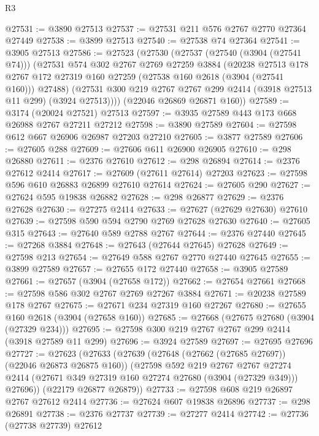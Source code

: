 \begin{lexlean}{R3}
\begin{coremodule}
@27531 := @3890 @27513
@27537 := @27531 @211 @576 @2767 @2770 @27364 @27449
@27538 := @3899 @27513
@27540 := @27538 @74 @27364
@27541 := @3905 @27513
@27586 := @27523
    (@27530
      (@27537
        (@27540 (@3904 (@27541 @74)))
        (@27531
          @574
          @302
          @2767
          @2769
          @27259
          @3884
          (@20238
            @27513
            @178
            @2767
            @172
            @27319
            @160
            @27259
            (@27538 @160 @2618 (@3904 (@27541 @160)))
            @27488)
          (@27531 @300 @219 @2767 @2767 @299 @2414 (@3918 @27513 @11 @299) (@3924 @27513))))
      (@22046 @26869 @26871 @160))
@27589 := @3174 (@20024 @27521) @27513
@27597 := @3935 @27589 @443 @173 @668 @26988 @2767 @27211 @27212
@27598 := @3890 @27589
@27604 := @27598 @612 @667 @26906 @26987 @27203 @27210
@27605 := @3877 @27589
@27606 := @27605 @288
@27609 := @27606 @611 @26900 @26905
@27610 := @298 @26880
@27611 := @2376 @27610
@27612 := @298 @26894
@27614 := @2376 @27612 @2414
@27617 := @27609 (@27611 @27614) @27203
@27623 := @27598 @596 @610 @26883 @26899 @27610 @27614
@27624 := @27605 @290
@27627 := @27624 @595 @19838 @26882
@27628 := @298 @26877
@27629 := @2376 @27628
@27630 := @27275 @2414
@27633 := @27627 (@27629 @27630) @27610
@27639 := @27598 @590 @594 @2790 @2769 @27628 @27630
@27640 := @27605 @315
@27643 := @27640 @589 @2788 @2767
@27644 := @2376 @27440
@27645 := @27268 @3884
@27648 := @27643 (@27644 @27645) @27628
@27649 := @27598 @213
@27654 := @27649 @588 @2767 @2770 @27440 @27645
@27655 := @3899 @27589
@27657 := @27655 @172 @27440
@27658 := @3905 @27589
@27661 := @27657 (@3904 (@27658 @172))
@27662 := @27654 @27661
@27668 := @27598 @586 @302 @2767 @2769 @27267 @3884
@27671 := @20238 @27589 @178 @2767
@27675 := @27671 @234 @27319 @160 @27267
@27680 := @27655 @160 @2618 (@3904 (@27658 @160))
@27685 := @27668 (@27675 @27680 (@3904 (@27329 @234)))
@27695 := @27598 @300 @219 @2767 @2767 @299 @2414 (@3918 @27589 @11 @299)
@27696 := @3924 @27589
@27697 := @27695 @27696
@27727 := @27623
    (@27633
      (@27639
        (@27648 (@27662 (@27685 @27697)) (@22046 @26873 @26875 @160))
        (@27598
          @592
          @219
          @2767
          @2767
          @27274
          @2414
          (@27671 @349 @27319 @160 @27274 @27680 (@3904 (@27329 @349)))
          @27696))
      (@22179 @26877 @26879))
@27733 := @27598 @608 @219 @26897 @2767 @27612 @2414
@27736 := @27624 @607 @19838 @26896
@27737 := @298 @26891
@27738 := @2376 @27737
@27739 := @27277 @2414
@27742 := @27736 (@27738 @27739) @27612

\end{coremodule}
\end{lexlean}
